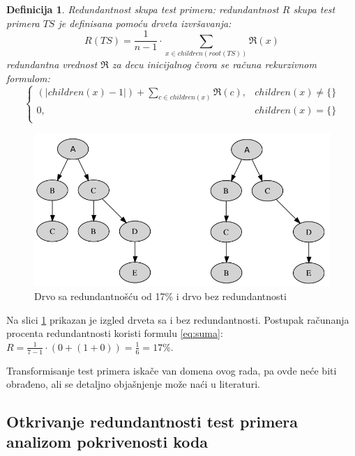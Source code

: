 \documentclass[a4paper]{article}
\newtheorem{definition}{Definicija}[section]
\begin{document}
\begin{definition}{Redundantnost skupa test primera:}
redundantnost $R$ skupa test primera $TS$ je definisana pomoću drveta izvršavanja:
\begin{equation}
\label{eq:suma}
    R(TS) = \frac{1}{n-1} \cdot \sum_{x \in children(root(TS))} \Re(x)
\end{equation}
redundantna vrednost $\Re$ za decu inicijalnog čvora se računa rekurzivnom formulom:
$$
    \begin{cases}
    (|children(x)-1|) + \sum_{c \in children(x)} \Re(c),  &  children(x) \neq \{\} \\
    0, &  children(x) = \{\} \\
    \end{cases}
$$
\end{definition}

\begin{figure}[h!]
\begin{center}
\includegraphics[scale=0.25]{redudancy.png}
\end{center}
\caption{Drvo sa redundantnošću od 17\% i drvo bez redundantnosti}
\label{fig:redundancy}
\end{figure}

Na slici \ref{fig:redundancy} prikazan je izgled drveta sa i bez redundantnosti. Postupak računanja procenta redundantnosti koristi formulu \ref{eq:suma}:
$ R = \frac{1}{7-1} \cdot (0 + (1+0)) = \frac{1}{6} = 17\% $.

Transformisanje test primera iskače van domena ovog rada, pa ovde neće biti obrađeno, ali se detaljno objašnjenje može naći u literaturi\cite{prvinacin}.

\subsection{Otkrivanje redundantnosti test primera analizom pokrivenosti koda}
\label{subsec:drugi}
\end{document}

